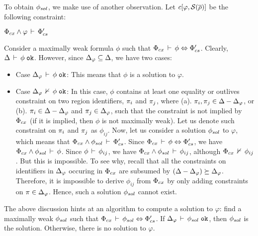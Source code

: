 To obtain $\phi_{sol}$, we make use of another observation. Let $c\lbrack
\varphi, \mathcal{S}(\overline{\rho}) \rbrack$ be the following constraint:
\begin{center}
\(
  \Phi_{cx} \wedge \varphi\,\vdash\,\Phi_{cs}'
\)
\end{center}
Consider a maximally weak formula $\phi$ such that
$\Phi_{cx}\,\vdash\,\phi \Leftrightarrow \Phi_{cs}'$. 
Clearly, $\Delta\,\vdash\,\phi \; \texttt{ok}$. However, since $\Delta_{\varphi}
\subseteq \Delta$, we have two cases:
\begin{itemize}

\item Case $\Delta_{\varphi}\,\vdash\,\phi \; \texttt{ok}$: This means that $\phi$ is
a solution to $\varphi$. 

\item Case $\Delta_{\varphi}\,\nvdash\,\phi \; \texttt{ok}$: In this case, $\phi$
contains at least one equality or outlives constraint on two region
identifiers, $\pi_i$ and $\pi_j$, where (a). $\pi_i,\pi_j \in
\Delta - \Delta_{\varphi}$, or (b). $\pi_i \in \Delta -
\Delta_{\varphi}$ and $\pi_j \in \Delta_{\varphi}$, such that the
constraint is not implied by $\Phi_{cx}$ (if it is implied, then $\phi$
is not maximally weak). Let us denote such constraint on $\pi_i$ and
$\pi_j$ as $\phi_{ij}$. Now, let us consider a solution $\phi_{sol}$ to
$\varphi$, which means that $\Phi_{cx} \wedge \phi_{sol}\,\vdash\,\Phi_{cs}'$.
Since $\Phi_{cx}\,\vdash\,\phi \Leftrightarrow \Phi_{cs}'$, we have
$\Phi_{cx} \wedge \phi_{sol}\,\vdash\,\phi$. Since
$\phi\,\vdash\,\phi_{ij}$, we have $\Phi_{cx} \wedge
\phi_{sol}\,\vdash\,\phi_{ij}$, although $\Phi_{cx}\,\nvdash\,\phi_{ij}$. But
this is impossible. To see why, recall that all the constraints on
identifiers in $\Delta_{\varphi}$ occuring in $\Phi_{cx}$ are subsumed
by $(\Delta - \Delta_{\varphi}) \succeq \Delta_{\varphi}$.
Therefore, it is impossible to derive $\phi_{ij}$ from $\Phi_{cx}$ by
only adding constraints on $\pi \in \Delta_{\varphi}$. Hence, such a
solution $\phi_{sol}$ cannot exist.
\end{itemize}
The above discussion hints at an algorithm to compute a solution to
$\varphi$: find a maximally weak $\phi_{sol}$ such that $\Phi_{cx}\,\vdash\,\phi_{sol} \Leftrightarrow \Phi_{cs}'$. If $\Delta_{\varphi}\,\vdash\,\phi_{sol} \; \texttt{ok}$, then $\phi_{sol}$ is the solution. Otherwise, there is no
solution to $\varphi$. 

